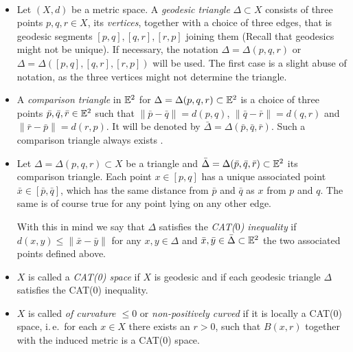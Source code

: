 
\begin{defin}~
  \label{def:cat}
  \begin{itemize}
  \item Let \((X,d)\) be a metric space. A \emph{geodesic triangle} \(\Delta \subset X\) consists of three points \(p,q,r \in X\), its \emph{vertices}, together with a choice of three edges, that is geodesic segments \([p,q], [q,r], [r, p]\) joining them (Recall that geodesics might not be unique). If necessary, the notation \(\Delta = \Delta(p,q,r)\) or \(\Delta = \Delta([p,q], [q,r], [r,p])\) will be used. The first case is a slight abuse of notation, as the three vertices might not determine the triangle.
  \item A \emph{comparison triangle} in \(\mathbb{E}^2\) for \(\Delta = \Delta(p,q,r) \subset \mathbb{E}^2\) is a choice of three points \(\bar p, \bar q, \bar r \in \mathbb{E}^2\) such that \(\|\bar p- \bar q\| = d(p, q)\), \(\|\bar q- \bar r\| = d(q, r)\) and \(\|\bar r- \bar p\| = d(r, p)\). It will be denoted by \(\bar \Delta = \Delta(\bar p, \bar q, \bar r)\). Such a comparison triangle always exists \cite[c.\,f.][Sec.\ I.2]{MR1744486}.
  \item Let \(\Delta = \Delta(p,q,r) \subset X\) be a triangle and \(\bar \Delta = \Delta(\bar p, \bar q, \bar r) \subset \mathbb{E}^2\) its comparison triangle. Each point \(x \in [p,q]\) has a unique associated point \(\bar x \in [\bar p, \bar q]\), which has the same distance from \(\bar p\) and \(\bar q\) as \(x\) from \(p\) and \(q\). The same is of course true for any point lying on any other edge.

    With this in mind we say that \(\Delta\) satisfies the \emph{CAT(\(0\)) inequality} if \(d(x,y) \leq \|\bar x- \bar y\|\) for any \(x, y \in \Delta\) and \(\bar x, \bar y \in \bar \Delta \subset \mathbb{E}^2\) the two associated points defined above.
  \item \(X\) is called a \emph{CAT(0) space} if \(X\) is geodesic and if each geodesic triangle \(\Delta\) satisfies the CAT(0) inequality.
  \item \(X\) is called \emph{of curvature \(\leq 0\)} or \emph{non-positively curved} if it is locally a CAT(\(0\)) space, i.\,e.\ for each \(x \in X\) there exists an \(r > 0\), such that \(B(x,r)\) together with the induced metric is a CAT(\(0\)) space.
  \end{itemize}
\end{defin}

